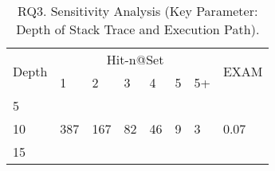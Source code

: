 \begin{table}[t]
	\caption{RQ3. Sensitivity Analysis (Key Parameter: Depth of Stack Trace and Execution Path).}
	{\small
		\begin{center}
			\renewcommand{\arraystretch}{1}
			\begin{tabular}{p{1cm}|p{0.3cm}<{\centering}|p{0.3cm}<{\centering}|p{0.3cm}<{\centering}|p{0.3cm}<{\centering}|p{0.3cm}<{\centering}|p{0.3cm}<{\centering}|p{0.7cm}<{\centering}}
				\hline
				\multirow{2}{*}{Depth}    & \multicolumn{6}{c|}{Hit-n@Set}& \multirow{2}{*}{EXAM}\\
				\cline{2-7}
				&1&2&3&4&5&5+&\\
				
				\hline 
				5 			                &  &  &   &  &  &    & \\
				10                          & 387 & 167 & 82  & 46 & 9 & 3   & 0.07\\
				15	                        &  &  &   &  &  &    & \\
				\hline
			\end{tabular}
			
			\label{fig:rq3-2}
		\end{center}
	}
\end{table}